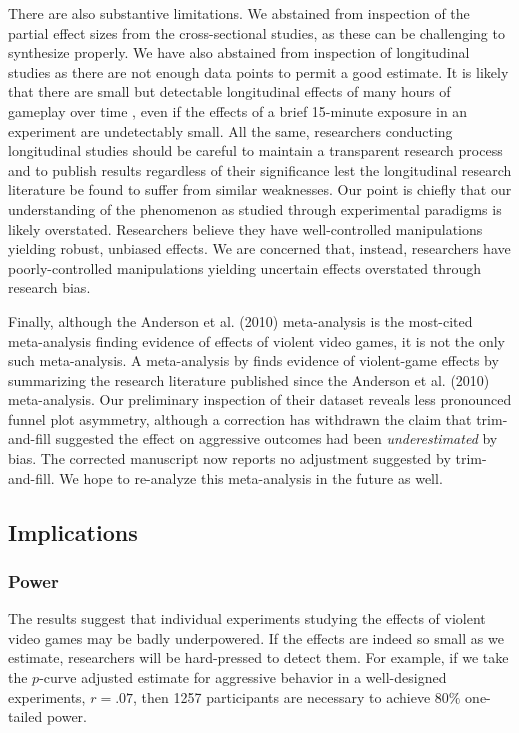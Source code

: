 \documentclass[man, mask]{apa6}
\begin{document}
There are also substantive limitations. We abstained from inspection of the partial effect sizes from the cross-sectional studies, as these can be challenging to synthesize properly. We have also abstained from inspection of longitudinal studies as there are not enough data points to permit a good estimate. It is likely that there are small but detectable longitudinal effects of many hours of gameplay over time \citep[e.g.,][]{Willoughby:etal:2012}, %
even if the effects of a brief 15-minute exposure in an experiment are undetectably small. All the same, researchers conducting longitudinal studies should be careful to maintain a transparent research process and to publish results regardless of their significance lest the longitudinal research literature be found to suffer from similar weaknesses. 
Our point is chiefly that our understanding of the phenomenon as studied through experimental paradigms is likely overstated. Researchers believe they have well-controlled manipulations yielding robust, unbiased effects. We are concerned that, instead, researchers have poorly-controlled manipulations yielding uncertain effects overstated through research bias.

Finally, although the Anderson et al. (2010) meta-analysis is the most-cited meta-analysis finding evidence of effects of violent video games, it is not the only such meta-analysis. A meta-analysis by \citet{Greitemeyer:Mugge:2014} finds evidence of violent-game effects by summarizing the research literature published since the Anderson et al. (2010) meta-analysis. Our preliminary inspection of their dataset reveals less pronounced funnel plot asymmetry, although a correction has withdrawn the claim that trim-and-fill suggested the effect on aggressive outcomes had been {\em underestimated} by bias. The corrected manuscript now reports no adjustment suggested by trim-and-fill. We hope to re-analyze this meta-analysis in the future as well.

\subsection{Implications}

\subsubsection{Power}
The results suggest that individual experiments studying the effects of violent video games may be badly underpowered. If the effects are indeed so small as we estimate, researchers will be hard-pressed to detect them. For example, if we take the $p$-curve adjusted estimate for aggressive behavior in a well-designed experiments, $r = .07$, then 1257 participants are necessary to achieve $80\%$ one-tailed power. 
\end{document}
